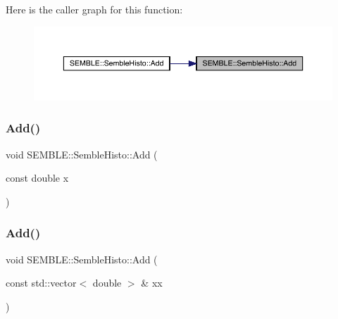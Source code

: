 Here is the caller graph for this function\+:
\nopagebreak
\begin{figure}[H]
\begin{center}
\leavevmode
\includegraphics[width=350pt]{d9/d05/structSEMBLE_1_1SembleHisto_a00b90e6db2c96fc02580cdf857918a41_icgraph}
\end{center}
\end{figure}
\mbox{\label{structSEMBLE_1_1SembleHisto_a00b90e6db2c96fc02580cdf857918a41}} 
\subsubsection{\texorpdfstring{Add()}{Add()}\hspace{0.1cm}{\footnotesize\ttfamily [2/4]}}
{\footnotesize\ttfamily void S\+E\+M\+B\+L\+E\+::\+Semble\+Histo\+::\+Add (\begin{DoxyParamCaption}\item[{const double}]{x }\end{DoxyParamCaption})\hspace{0.3cm}{\ttfamily [inline]}}

\mbox{\label{structSEMBLE_1_1SembleHisto_a98b100d47d96f0f164165367b6b97d7a}} 
\subsubsection{\texorpdfstring{Add()}{Add()}\hspace{0.1cm}{\footnotesize\ttfamily [3/4]}}
{\footnotesize\ttfamily void S\+E\+M\+B\+L\+E\+::\+Semble\+Histo\+::\+Add (\begin{DoxyParamCaption}\item[{const std\+::vector$<$ double $>$ \&}]{xx }\end{DoxyParamCaption})}

\mbox{\label{structSEMBLE_1_1SembleHisto_a98b100d47d96f0f164165367b6b97d7a}} 
